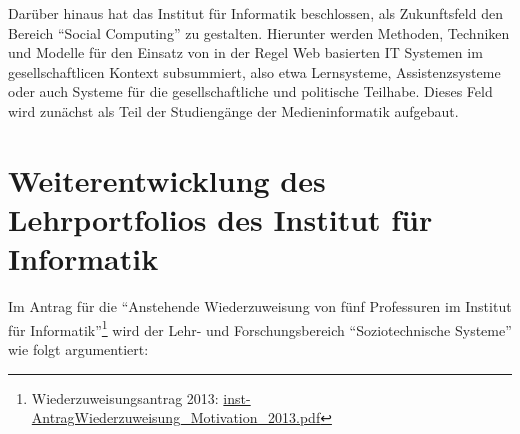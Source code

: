 Darüber hinaus hat das Institut für Informatik beschlossen, als
Zukunftsfeld den Bereich ``Social Computing'' zu gestalten. Hierunter
werden Methoden, Techniken und Modelle für den Einsatz von in der Regel
Web basierten IT Systemen im gesellschaftlicen Kontext subsummiert, also
etwa Lernsysteme, Assistenzsysteme oder auch Systeme für die
gesellschaftliche und politische Teilhabe. Dieses Feld wird zunächst als
Teil der Studiengänge der Medieninformatik aufgebaut.

\section{Weiterentwicklung des Lehrportfolios des Institut für
Informatik}\label{weiterentwicklung-des-lehrportfolios-des-institut-fuxfcr-informatik}

Im Antrag für die ``Anstehende Wiederzuweisung von fünf Professuren im
Institut für Informatik''\footnote{Wiederzuweisungsantrag 2013:
  \href{../anhaenge/inst-AntragWiederzuweisung_Motivation_2013.pdf}{inst-AntragWiederzuweisung\_Motivation\_2013.pdf}}
wird der Lehr- und Forschungsbereich ``Soziotechnische Systeme'' wie
folgt argumentiert:

